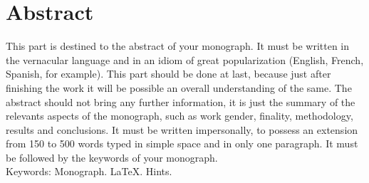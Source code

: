 
\chapter*{Abstract}

\thispagestyle{myheadings}

This part is destined to the abstract of your monograph. It must be written in the vernacular language and in an idiom of great popularization (English, French, Spanish, for example). This part should be done at last, because just after finishing the work it will be possible an overall understanding of the same. The abstract should not bring any further information, it is just the summary of the relevants aspects of the monograph, such as work gender, finality, methodology, results and conclusions. It must be written impersonally, to possess an extension from 150 to 500 words typed in simple space and in only one paragraph. It must be followed by the keywords of your monograph.\\

Keywords: Monograph. LaTeX. Hints.

